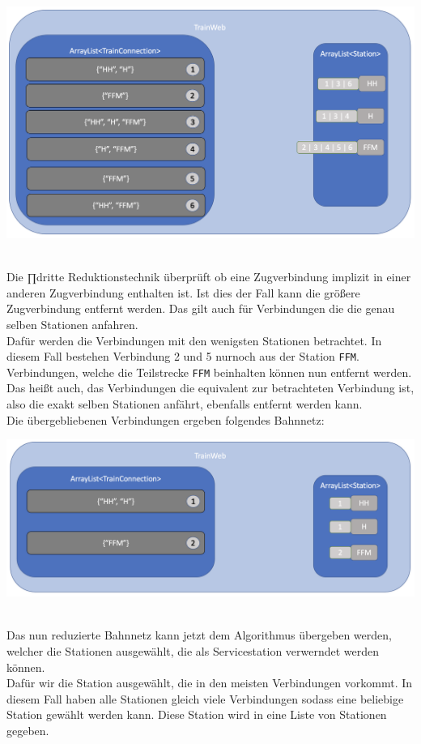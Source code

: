 \begin{center}
    \includegraphics[width=\linewidth]{images/Programmdurchlauf/Datenstruktur02.png}
    \label{test:subsecpar:datenstruktur2}
\end{center}
\\
Die ∏dritte Reduktionstechnik überprüft ob eine Zugverbindung implizit in einer anderen Zugverbindung enthalten ist. Ist dies der Fall kann die größere Zugverbindung entfernt werden. Das gilt auch für Verbindungen die die genau selben Stationen anfahren.\\
Dafür werden die Verbindungen mit den wenigsten Stationen betrachtet. In diesem Fall bestehen Verbindung 2 und 5 nurnoch aus der Station \texttt{FFM}. Verbindungen, welche die Teilstrecke \texttt{FFM} beinhalten können nun entfernt werden. Das heißt auch, das Verbindungen die equivalent zur betrachteten Verbindung ist, also die exakt selben Stationen anfährt, ebenfalls entfernt werden kann.\\
Die übergebliebenen Verbindungen ergeben folgendes Bahnnetz:\\

\begin{center}
    \includegraphics[width=\linewidth]{images/Programmdurchlauf/Datenstruktur03.png}
    \label{test:subsecpar:datenstruktur3}
\end{center}
\\
Das nun reduzierte Bahnnetz kann jetzt dem Algorithmus übergeben werden, welcher die Stationen ausgewählt, die als Servicestation verwerndet werden können.\\
Dafür wir die Station ausgewählt, die in den meisten Verbindungen vorkommt. In diesem Fall haben alle Stationen gleich viele Verbindungen sodass eine beliebige Station gewählt werden kann. Diese Station wird in eine Liste von Stationen gegeben.\\

